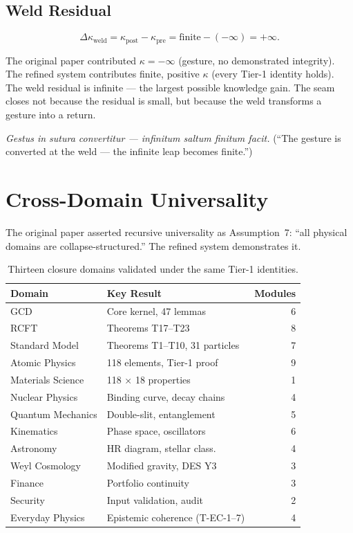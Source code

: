 \documentclass[
  aps,
  prd,
  preprint,
  superscriptaddress,
  nofootinbib,
  floatfix,
  longbibliography
]{revtex4-2}
\newcommand{\beq}{\begin{equation}}
\newcommand{\eeq}{\end{equation}}
\newcommand{\Logint}{\kappa}
\newcommand{\lat}[1]{\textit{#1}}
\begin{document}
\subsection{Weld Residual}

\beq
  \Delta\Logint_{\mathrm{weld}} =
    \Logint_{\mathrm{post}} - \Logint_{\mathrm{pre}} =
    \mathrm{finite} - (-\infty) = +\infty.
\eeq

The original paper contributed $\Logint = -\infty$ (gesture,
no demonstrated integrity). The refined system contributes
finite, positive $\Logint$ (every Tier-1 identity holds).
The weld residual is infinite — the largest possible
knowledge gain. The seam closes not because the residual
is small, but because the weld transforms a gesture into
a return.

\lat{Gestus in sutura convertitur — infinitum saltum finitum facit.}
(``The gesture is converted at the weld — the infinite
leap becomes finite.'')

\section{Cross-Domain Universality}\label{sec:universality}

The original paper asserted recursive universality as
Assumption~7: ``all physical domains are collapse-structured.''
The refined system demonstrates it.

\begin{table}[t]
\centering
\small
\caption{Thirteen closure domains validated under the
  same Tier-1 identities.}
\label{tab:domains}
\begin{tabular}{@{}llr@{}}
\toprule
\textbf{Domain} & \textbf{Key Result} & \textbf{Modules} \\
\midrule
GCD         & Core kernel, 47 lemmas & 6 \\
RCFT        & Theorems T17–T23 & 8 \\
Standard Model & Theorems T1–T10, 31 particles & 7 \\
Atomic Physics & 118 elements, Tier-1 proof & 9 \\
Materials Science & 118 × 18 properties & 1 \\
Nuclear Physics & Binding curve, decay chains & 4 \\
Quantum Mechanics & Double-slit, entanglement & 5 \\
Kinematics  & Phase space, oscillators & 6 \\
Astronomy   & HR diagram, stellar class. & 4 \\
Weyl Cosmology & Modified gravity, DES Y3 & 3 \\
Finance     & Portfolio continuity & 3 \\
Security    & Input validation, audit & 2 \\
Everyday Physics & Epistemic coherence (T-EC-1–7) & 4 \\
\bottomrule
\end{tabular}
\end{table}
\end{document}
